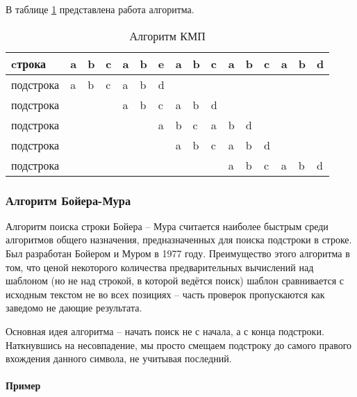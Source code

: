 В таблице \ref{table:kmp} представлена работа алгоритма.

\begin{table}[H]
    \centering
    \caption{Алгоритм КМП}
    \label{table:kmp}
    \begin{tabular}{|l|l|l|l|l|l|l|l|l|l|l|l|l|l|l|l|}
    \hline
    cтрока & a & b & c & a & b & e  & a & b & c & a & b & c & a & b & d\\
    \hline
    подстрока & a & b & c & a & b & \cellcolor[HTML]{FE0000}d & & & & & & & & & \\
    \hline
    подстрока & & & & a & b & \cellcolor[HTML]{FE0000}c & a & b & d & & & & & & \\
    \hline
    подстрока & & & & & & \cellcolor[HTML]{FE0000}a & b & c & a & b & d & & & & \\
    \hline
    подстрока & & & & & & & a & b & c & a & b & \cellcolor[HTML]{FE0000}d & & & \\
    \hline
    подстрока & & & & & & & & & & \cellcolor[HTML]{34FF34}a & \cellcolor[HTML]{34FF34}b & \cellcolor[HTML]{34FF34}c & \cellcolor[HTML]{34FF34}a & \cellcolor[HTML]{34FF34}b & \cellcolor[HTML]{34FF34}d \\
    \hline
    \end{tabular}
\end{table}

\subsubsection{Алгоритм Бойера-Мура}

Алгоритм поиска строки Бойера -- Мура считается наиболее быстрым
среди алгоритмов общего назначения, предназначенных для поиска
подстроки в строке. Был разработан Бойером и Муром в 1977 году.
Преимущество этого алгоритма в том, что ценой некоторого количества
предварительных вычислений над шаблоном (но не над строкой, в которой
ведётся поиск) шаблон сравнивается с исходным текстом не во всех
позициях -- часть проверок пропускаются как заведомо не дающие
результата.

Основная идея алгоритма -- начать поиск не с начала, а с конца
подстроки. Наткнувшись на несовпадение, мы просто смещаем подстроку
до самого правого вхождения данного символа, не учитывая последний.

\paragraph{Пример}


